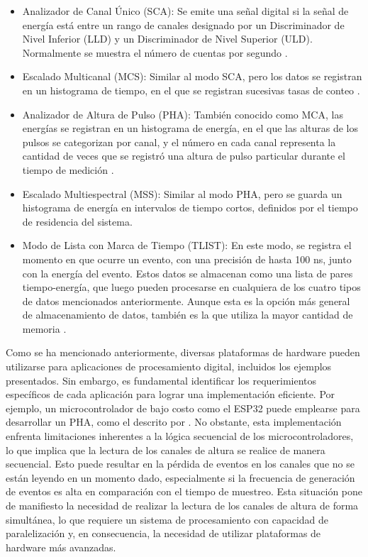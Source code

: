 \documentclass{report}
\begin{document}
\begin{itemize}
    \item Analizador de Canal Único (SCA): Se emite una señal digital si la señal de energía está entre un rango de canales designado por un Discriminador de Nivel Inferior (LLD) y un Discriminador de Nivel Superior (ULD). Normalmente se muestra el número de cuentas por segundo \cite{knoll5}.

    \item Escalado Multicanal (MCS): Similar al modo SCA, pero los datos se registran en un histograma de tiempo, en el que se registran sucesivas tasas de conteo \cite{knoll8}.
    
    \item Analizador de Altura de Pulso (PHA): También conocido como MCA, las energías se registran en un histograma de energía, en el que las alturas de los pulsos se categorizan por canal, y el número en cada canal representa la cantidad de veces que se registró una altura de pulso particular durante el tiempo de medición \cite{knoll6}.
    
    \item Escalado Multiespectral (MSS): Similar al modo PHA, pero se guarda un histograma de energía en intervalos de tiempo cortos, definidos por el tiempo de residencia del sistema\cite{knoll8}.
    
    \item Modo de Lista con Marca de Tiempo (TLIST): En este modo, se registra el momento en que ocurre un evento, con una precisión de hasta 100 ns, junto con la energía del evento. Estos datos se almacenan como una lista de pares tiempo-energía, que luego pueden procesarse en cualquiera de los cuatro tipos de datos mencionados anteriormente. Aunque esta es la opción más general de almacenamiento de datos, también es la que utiliza la mayor cantidad de memoria \cite{burnett2019time}.
\end{itemize}

\noindent Como se ha mencionado anteriormente, diversas plataformas de hardware pueden utilizarse para aplicaciones de procesamiento digital, incluidos los ejemplos presentados. Sin embargo, es fundamental identificar los requerimientos específicos de cada aplicación para lograr una implementación eficiente. Por ejemplo, un microcontrolador de bajo costo como el ESP32 puede emplearse para desarrollar un PHA, como el descrito por \cite{ramirez2024}. No obstante, esta implementación enfrenta limitaciones inherentes a la lógica secuencial de los microcontroladores, lo que implica que la lectura de los canales de altura se realice de manera secuencial. Esto puede resultar en la pérdida de eventos en los canales que no se están leyendo en un momento dado, especialmente si la frecuencia de generación de eventos es alta en comparación con el tiempo de muestreo. Esta situación pone de manifiesto la necesidad de realizar la lectura de los canales de altura de forma simultánea, lo que requiere un sistema de procesamiento con capacidad de paralelización y, en consecuencia, la necesidad de utilizar plataformas de hardware más avanzadas.\\
\end{document}
